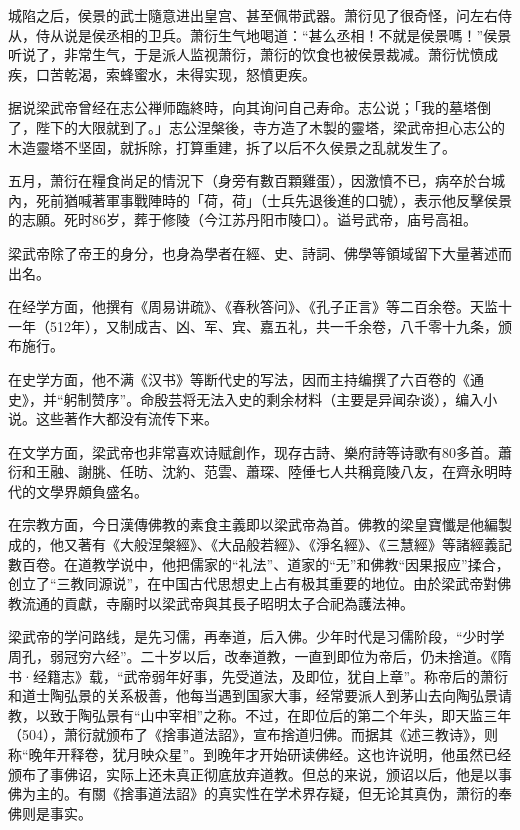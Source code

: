 城陷之后，侯景的武士隨意进出皇宫、甚至佩带武器。萧衍见了很奇怪，问左右侍从，侍从说是侯丞相的卫兵。萧衍生气地喝道：“甚么丞相！不就是侯景嗎！”侯景听说了，非常生气，于是派人监视萧衍，萧衍的饮食也被侯景裁减。萧衍忧愤成疾，口苦乾渴，索蜂蜜水，未得实现，怒憤更疾。

据说梁武帝曾经在志公禅师臨終時，向其询问自己寿命。志公说；「我的墓塔倒了，陛下的大限就到了。」志公涅槃後，寺方造了木製的靈塔，梁武帝担心志公的木造靈塔不坚固，就拆除，打算重建，拆了以后不久侯景之乱就发生了。

五月，萧衍在糧食尚足的情況下（身旁有數百顆雞蛋），因激憤不已，病卒於台城內，死前猶喊著軍事戰陣時的「荷，荷」（士兵先退後進的口號），表示他反擊侯景的志願。死时86岁，葬于修陵（今江苏丹阳市陵口）。谥号武帝，庙号高祖。

梁武帝除了帝王的身分，也身為學者在經、史、詩詞、佛學等領域留下大量著述而出名。

在经学方面，他撰有《周易讲疏》、《春秋答问》、《孔子正言》等二百余卷。天监十一年（512年），又制成吉、凶、军、宾、嘉五礼，共一千余卷，八千零十九条，颁布施行。

在史学方面，他不满《汉书》等断代史的写法，因而主持编撰了六百卷的《通史》，并“躬制赞序”。命殷芸将无法入史的剩余材料（主要是异闻杂谈），编入小说。这些著作大都没有流传下来。

在文学方面，梁武帝也非常喜欢诗赋創作，现存古詩、樂府詩等诗歌有80多首。蕭衍和王融、謝朓、任昉、沈約、范雲、蕭琛、陸倕七人共稱竟陵八友，在齊永明時代的文學界頗負盛名。

在宗教方面，今日漢傳佛教的素食主義即以梁武帝為首。佛教的梁皇寶懺是他編製成的，他又著有《大般涅槃經》、《大品般若經》、《淨名經》、《三慧經》等諸經義記數百卷。在道教学说中，他把儒家的“礼法”、道家的“无”和佛教“因果报应”揉合，创立了“三教同源说”，在中国古代思想史上占有极其重要的地位。由於梁武帝對佛教流通的貢獻，寺廟时以梁武帝與其長子昭明太子合祀為護法神。

梁武帝的学问路线，是先习儒，再奉道，后入佛。少年时代是习儒阶段，“少时学周孔，弱冠穷六经”。二十岁以后，改奉道教，一直到即位为帝后，仍未捨道。《隋书·经籍志》载，“武帝弱年好事，先受道法，及即位，犹自上章”。称帝后的萧衍和道士陶弘景的关系极善，他每当遇到国家大事，经常要派人到茅山去向陶弘景请教，以致于陶弘景有“山中宰相”之称。不过，在即位后的第二个年头，即天监三年（504），萧衍就颁布了《捨事道法詔》，宣布捨道归佛。而据其《述三教诗》，则称“晚年开释卷，犹月映众星”。到晚年才开始研读佛经。这也许说明，他虽然已经颁布了事佛诏，实际上还未真正彻底放弃道教。但总的来说，颁诏以后，他是以事佛为主的。有關《捨事道法詔》的真实性在学术界存疑，但无论其真伪，萧衍的奉佛则是事实。

